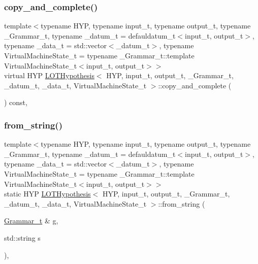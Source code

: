 \subsubsection{\texorpdfstring{copy\+\_\+and\+\_\+complete()}{copy\_and\_complete()}}
{\footnotesize\ttfamily template$<$typename H\+YP, typename input\+\_\+t, typename output\+\_\+t, typename \+\_\+\+Grammar\+\_\+t, typename \+\_\+datum\+\_\+t = defauldatum\+\_\+t$<$input\+\_\+t, output\+\_\+t$>$, typename \+\_\+data\+\_\+t = std\+::vector$<$\+\_\+datum\+\_\+t$>$, typename Virtual\+Machine\+State\+\_\+t = typename \+\_\+\+Grammar\+\_\+t\+::template Virtual\+Machine\+State\+\_\+t$<$input\+\_\+t, output\+\_\+t$>$$>$ \\
virtual H\+YP \hyperlink{class_l_o_t_hypothesis}{L\+O\+T\+Hypothesis}$<$ H\+YP, input\+\_\+t, output\+\_\+t, \+\_\+\+Grammar\+\_\+t, \+\_\+datum\+\_\+t, \+\_\+data\+\_\+t, Virtual\+Machine\+State\+\_\+t $>$\+::copy\+\_\+and\+\_\+complete (\begin{DoxyParamCaption}{ }\end{DoxyParamCaption}) const\hspace{0.3cm}{\ttfamily [inline]}, {\ttfamily [virtual]}}

\mbox{\label{class_l_o_t_hypothesis_aa1e3f898618de841bfd8c9279a107211}} 
\subsubsection{\texorpdfstring{from\+\_\+string()}{from\_string()}}
{\footnotesize\ttfamily template$<$typename H\+YP, typename input\+\_\+t, typename output\+\_\+t, typename \+\_\+\+Grammar\+\_\+t, typename \+\_\+datum\+\_\+t = defauldatum\+\_\+t$<$input\+\_\+t, output\+\_\+t$>$, typename \+\_\+data\+\_\+t = std\+::vector$<$\+\_\+datum\+\_\+t$>$, typename Virtual\+Machine\+State\+\_\+t = typename \+\_\+\+Grammar\+\_\+t\+::template Virtual\+Machine\+State\+\_\+t$<$input\+\_\+t, output\+\_\+t$>$$>$ \\
static H\+YP \hyperlink{class_l_o_t_hypothesis}{L\+O\+T\+Hypothesis}$<$ H\+YP, input\+\_\+t, output\+\_\+t, \+\_\+\+Grammar\+\_\+t, \+\_\+datum\+\_\+t, \+\_\+data\+\_\+t, Virtual\+Machine\+State\+\_\+t $>$\+::from\+\_\+string (\begin{DoxyParamCaption}\item[{\hyperlink{class_l_o_t_hypothesis_a8006204013d471860e54c49d19edbace}{Grammar\+\_\+t} \&}]{g,  }\item[{std\+::string}]{s }\end{DoxyParamCaption})\hspace{0.3cm}{\ttfamily [inline]}, {\ttfamily [static]}}

